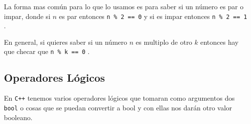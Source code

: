 \documentclass[12pt, fleqn]{report}                             %
\theoremstyle{break}                                            %
\newcommand{\textCode}[1]  { \texttt{#1} }                      %
\newcommand \Cpp  {\textCode{C++} }                               %
\begin{document}
                    La forma mas común para lo que lo usamos
                    es para saber si un número es par o impar, donde
                    si $n$ es par entonces \textCode{n \% 2 == 0} y si es impar
                    entonces \textCode{n \% 2 == 1}.

                    En general, si quieres saber si un número $n$ es multiplo de 
                    otro $k$ entonces hay que checar que \textCode{n \% k == 0}.

            \subsection{Operadores Lógicos}

                En \Cpp tenemos varios operadores lógicos que tomaran como argumentos dos 
                \textCode{bool} o cosas que se puedan convertir a bool y con ellas nos darán otro
                valor booleano.
\end{document}
